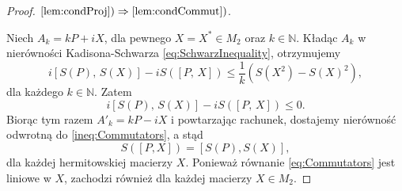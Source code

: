 \begin{proof}
$\ref{lem:condProj}) \Rightarrow \ref{lem:condCommut})$.

Niech $A_{k} = kP + iX$, dla pewnego $X = X^{*} \in M_2$
oraz $k \in \mathbb{N}$.
Kładąc $A_{k}$ w nierówności Kadisona-Schwarza
\eqref{eq:SchwarzInequality}, otrzymujemy
\begin{equation}
i [S(P), \,  S(X)] - i S([P, \, X])  \leq \frac{1}{k} \left( S(X^{2}) - S(X)^{2} \right),
\end{equation}
dla każdego $k \in \mathbb{N}$.
Zatem
\begin{equation}
\label{ineq:Commutators}
i [S(P), \, S(X)] - i S([P, \, X]) \leq 0.
\end{equation}
Biorąc tym razem $A'_{k} =kP - i X$ i powtarzając rachunek,
dostajemy nierówność odwrotną do \eqref{ineq:Commutators},
a stąd
\begin{equation}
\label{eq:Commutators}
S([P, X]) = [S(P), S(X)],
\end{equation}
dla każdej hermitowskiej macierzy $X$.
Ponieważ równanie \eqref{eq:Commutators} jest liniowe w $X$,
zachodzi również dla każdej macierzy $X \in M_{2}$.


\end{proof}
